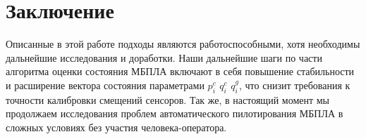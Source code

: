 \documentclass[12pt,a4paper]{article}
\begin{document}
\section{Заключение}

Описанные в этой работе подходы являются работоспособными, хотя необходимы дальнейшие исследования и доработки. Наши дальнейшие шаги по части алгоритма оценки состояния МБПЛА включают в себя повышение стабильности и расширение вектора состояния параметрами $p_i^c$ $q_i^c$ $q_i^g$, что снизит требования к точности калибровки смещений сенсоров. Так же, в настоящий момент мы продолжаем исследования проблем автоматического пилотирования МБПЛА в сложных условиях без участия человека-оператора.

\nocite{*}
\newpage
\begin{fullwidth}
\printbibliography
\end{fullwidth}
\end{document}
